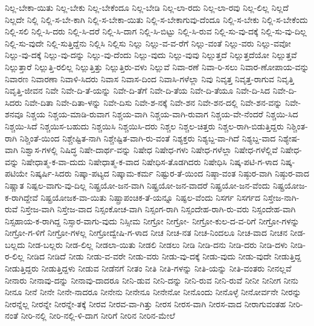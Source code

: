 {ನಿಲ್ಲ-ಬೇಕಾ-ಯಿತು
ನಿಲ್ಲ-ಬೇಕು
ನಿಲ್ಲ-ಬೇಕೆಂದೂ
ನಿಲ್ಲ-ಬೇಡಿ
ನಿಲ್ಲ-ಲಾ-ರದು
ನಿಲ್ಲ-ಲಾ-ರವು
ನಿಲ್ಲ-ಲಿಲ್ಲ
ನಿಲ್ಲದೆ
ನಿಲ್ಲದೇ
ನಿಲ್ಲಿ
ನಿಲ್ಲಿ-ಸ-ಬೇ-ಕಾಗಿ
ನಿಲ್ಲಿ-ಸ-ಬೇಕಾ-ಯಿತು
ನಿಲ್ಲಿ-ಸ-ಬೇಕಾಗುವು-ದೆಂದೂ
ನಿಲ್ಲಿ-ಸ-ಬೇಕು
ನಿಲ್ಲಿ-ಸ-ಬೇಕೆಂದು
ನಿಲ್ಲಿ-ಸಲಿ
ನಿಲ್ಲಿ-ಸಿ-ದರು
ನಿಲ್ಲಿ-ಸಿ-ದರೆ
ನಿಲ್ಲಿ-ಸಿ-ದಾಗ
ನಿಲ್ಲಿ-ಸಿ-ಬಿಟ್ಟು
ನಿಲ್ಲಿ-ಸಿ-ರುವ
ನಿಲ್ಲಿ-ಸು-ವು-ದಕ್ಕೆ
ನಿಲ್ಲಿ-ಸು-ವು-ದಿಲ್ಲ
ನಿಲ್ಲಿ-ಸು-ವುದೇ
ನಿಲ್ಲಿ-ಸುತ್ತಿದ್ದೆನು
ನಿಲ್ಲಿಸಿ
ನಿಲ್ಲಿಸು
ನಿಲ್ಲು
ನಿಲ್ಲು-ವ-ವ-ರೆಗೆ
ನಿಲ್ಲು-ವಂತೆ
ನಿಲ್ಲು-ವರು
ನಿಲ್ಲು-ವವೋ
ನಿಲ್ಲು-ವು-ದಕ್ಕೆ
ನಿಲ್ಲು-ವು-ದನ್ನು
ನಿಲ್ಲು-ವು-ದೆಂದು
ನಿಲ್ಲು-ವುದು
ನಿಲ್ಲು-ವುವು
ನಿಲ್ಲುತ್ತದೆ
ನಿಲ್ಲುತ್ತದೆಯೋ
ನಿಲ್ಲುತ್ತವೆ
ನಿಲ್ಲುತ್ತಾರೆ
ನಿಲ್ಲುತ್ತಿ-ರಲಿಲ್ಲ
ನಿಲ್ಲುತ್ತಿತ್ತು
ನಿಲ್ಲುತ್ತಿರು-ವಳು
ನಿಲ್ಲುವೆ
ನಿವಾ-ರಣೆ
ನಿವಾ-ರಿ-ಸಲು
ನಿವಾರ-ಣೋಪಾಯ-ವನ್ನು
ನಿವಾರಣ
ನಿವಾರಣಾ
ನಿವಾಳಿ-ಸಿದರು
ನಿವಾಸ
ನಿವಾಸ-ದಿಂದ
ನಿವಾಸಿ-ಗಳೆಲ್ಲಾ
ನಿವು
ನಿವೃತ್ತ
ನಿವೃತ್ತ-ರಾಗುವ
ನಿವೃತ್ತಿ
ನಿವೃತ್ತಿ-ಜೀವನ
ನಿವೇ
ನಿವೇ-ದಿ-ತೆ-ಯನ್ನು
ನಿವೇ-ದಿ-ತೆಗೆ
ನಿವೇ-ದಿ-ತೆಯ
ನಿವೇ-ದಿ-ತೆಯೂ
ನಿವೇ-ದಿ-ಸಿದ
ನಿವೇ-ದಿ-ಸಿದರು
ನಿವೇ-ದಿತಾ
ನಿವೇ-ದಿತಾ-ಳನ್ನು
ನಿವೇ-ದಿಸು
ನಿವೇ-ಶ-ನಕ್ಕೆ
ನಿವೇ-ಶನ
ನಿವೇ-ಶನ-ದಲ್ಲಿ
ನಿವೇ-ಶನ-ವನ್ನು
ನಿವೇ-ಶನವೂ
ನಿಶ್ಚಯ
ನಿಶ್ಚಯ-ಮಾಡಿ-ರುವಾಗ
ನಿಶ್ಚಯ-ವಾಗಿ
ನಿಶ್ಚಯ-ವಾಗಿ-ರುವಾಗ
ನಿಶ್ಚಯ-ವೇ-ನೆಂದರೆ
ನಿಶ್ಚಯಿ-ಸಿದ
ನಿಶ್ಚಯಿ-ಸಿದೆ
ನಿಶ್ಚಯಿಸ-ಬಹುದು
ನಿಶ್ಚಯಿಸಿ
ನಿಶ್ಚಯಿಸಿ-ದರು
ನಿಶ್ಚಲ
ನಿಶ್ಚಲ-ಚಿತ್ತರು
ನಿಶ್ಚಲ-ರಾಗಿ-ಬಿಡುತ್ತಿದ್ದರು
ನಿಶ್ಚಿಂತ-ರಾಗಿ
ನಿಶ್ಚಿಂತೆ-ಯಿಂದ
ನಿಶ್ಚೇಷ್ಟಿತ-ನಾಗಿ
ನಿಶ್ಚೇಷ್ಟಿತ-ವಾಗಿ-ರು-ವಂತೆ
ನಿಶ್ಯಕ್ತರು
ನಿಶ್ಯಬ್ದ-ವಾ-ಗಿದೆ
ನಿಶ್ಯಬ್ದ-ವಾದ
ನಿಶ್ಯೇಷ-ವಾಗಿ
ನಿಶ್ವಾಸ-ಗಳಲ್ಲಿ
ನಿಷಿದ್ಧ
ನಿಷೇ-ದಾರ್ಥ-ವನ್ನು
ನಿಷೇಧ
ನಿಷೇಧ-ಗಳು
ನಿಷೇಧ-ಗಳೆಲ್ಲಾ
ನಿಷೇಧ-ಗಳೆಲ್ಲಿವೆ
ನಿಷೇಧ-ವನ್ನು
ನಿಷೇಧಾತ್ಮ-ಕ-ವಾ-ದುದು
ನಿಷೇಧಾತ್ಮ-ಕ-ವಾದ
ನಿಷೇಧಿಸ-ತೊಡಗಿದರು
ನಿಷೇಧಿಸಿ
ನಿಷ್ಕ-ಪಟಿ-ಗ-ಳಾದ
ನಿಷ್ಕ-ಪಟಿಯೇ
ನಿಷ್ಕರ್ಷಿ-ಸಿದರು
ನಿಷ್ಕಾ-ಪಟ್ಯದ
ನಿಷ್ಕಾಮ-ಕರ್ಮ
ನಿಷ್ಟುರ-ತೆ-ಯಿಂದ
ನಿಷ್ಠಾ-ವಂತ
ನಿಷ್ಠುರ-ವಾಗಿ
ನಿಷ್ಠುರ-ವಾದ
ನಿಷ್ಣಾತ
ನಿಷ್ಪಲ-ವಾಗು-ವು-ದಿಲ್ಲ
ನಿಷ್ಪ್ರಯೋ-ಜನ-ವಾಗಿ
ನಿಷ್ಪ್ರಯೋ-ಜನ-ವಾದರೆ
ನಿಷ್ಪ್ರಯೋ-ಜನ-ವೆಂದು
ನಿಷ್ಪ್ರಯೋಜ-ಕ-ರಾಗಿದ್ದೇವೆ
ನಿಷ್ಪ್ರಯೋಜಕ-ವಾ-ಯಿತು
ನಿಷ್ಪ್ರಾಪಂಚಿಕ-ತೆ-ಯನ್ನೂ
ನಿಷ್ಫಲ-ವೆಂದು
ನಿಸರ್ಗ
ನಿಸರ್ಗದ
ನಿಸ್ತೇಜ-ನಾಗಿ-ರುವೆ
ನಿಸ್ತೇಜ-ವಾಗಿ
ನಿಸ್ತೇಜ-ವಾದ
ನಿಸ್ಸಂಕೋಚ-ವಾಗಿ
ನಿಸ್ಸಂಗ-ರಾಗಿ
ನಿಸ್ಸಂದೇಹ-ರಾಗಿ-ರು-ವರು
ನಿಸ್ಸಂದೇಹ-ವಾಗಿ
ನಿಸ್ಸಹಾಯ-ಕ-ರಾಗಿದ್ದ
ನಿಸ್ಸಾರ-ವಾಗು-ವುದು
ನಿಸ್ಸೀಮ
ನೀಗ್ರೋ
ನೀಗ್ರೋ-
ನೀಗ್ರೋ-ಕುಲ-ದ-ವ-ರಿಗೆ
ನೀಗ್ರೋ-ಗಳನ್ನು
ನೀಗ್ರೋ-ಗ-ಳಿಗೆ
ನೀಗ್ರೋ-ಗಳಲ್ಲ
ನೀಗ್ರೋದ್ವೇಷಿ-ಗ-ಳಾದ
ನೀಚ
ನೀಚ-ನತ
ನೀಚ-ನಿಂದಲೂ
ನೀಚ-ವಾದ
ನೀಚನ
ನೀಡ-ಬಲ್ಲದು
ನೀಡ-ಬಲ್ಲರು
ನೀಡ-ಲಿಲ್ಲ
ನೀಡಲಾ-ಯಿತು
ನೀಡಲಿ
ನೀಡಲು
ನೀಡಿ
ನೀಡಿ-ದನು
ನೀಡಿ-ದರು
ನೀಡಿ-ದಳು
ನೀಡಿ-ರ-ಲಿಲ್ಲ
ನೀಡಿದ
ನೀಡಿದೆ
ನೀಡು
ನೀಡು-ವ-ವರೇ
ನೀಡು-ವರು
ನೀಡು-ವು-ದಕ್ಕೆ
ನೀಡು-ವುದು
ನೀಡು-ವುದೇ
ನೀಡುತ್ತಿದ್ದ
ನೀಡುತ್ತಿದ್ದರು
ನೀಡುತ್ತಿದ್ದಳು
ನೀಡುವ
ನೀಡೆನಗೆ
ನೀತಂ
ನೀತಿ
ನೀತಿ-ಗಳನ್ನು
ನೀತಿ-ಯನ್ನು
ನೀತಿ-ವಂತರು
ನೀನಲ್ಲವೆ
ನೀನಾರು
ನೀನಾವು-ದನ್ನು
ನೀನಾವು-ದಾದರೂ
ನೀನಿ-ಡುವ
ನೀನಿ-ದನ್ನು
ನೀನಿ-ರುವ
ನೀನಿ-ರುವೆ
ನೀನೀ
ನೀನೀಗ
ನೀನು
ನೀನೂ
ನೀನೆ
ನೀನೇ
ನೀನೇ-ನಾದರೂ
ನೀನೇನು
ನೀನೇನೂ
ನೀನೇನೋ
ನೀನೊಂದು
ನೀನೊಳ್ಳೆ
ನೀನೋರ್ವನೇ
ನೀರನ್ನು
ನೀರನ್ನೆಲ್ಲ
ನೀರನ್ನೇ
ನೀರನ್ನೇ-ತಕ್ಕೆ
ನೀರವ
ನೀರವ-ವಾ-ಗಿತ್ತು
ನೀರಸ
ನೀರಸ-ವಾಗಿ
ನೀರಸ-ವಾದ
ನೀರಾಗುವಂತಹ
ನೀರಿ-ನಂತೆ
ನೀರಿ-ನಲ್ಲಿ
ನೀರಿ-ನಲ್ಲಿ-ಳಿ-ದಾಗ
ನೀರಿಗೆ
ನೀರಿನ
ನೀರಿನ-ಮೇಲೆ
}
